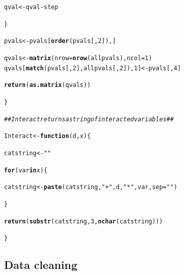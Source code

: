 \documentclass[11pt, a4paper]{article}\usepackage[]{graphicx}\usepackage[]{color}
\makeatletter
\newcommand{\hlnum}[1]{\textcolor[rgb]{0.686,0.059,0.569}{#1}}%
\newcommand{\hlstr}[1]{\textcolor[rgb]{0.192,0.494,0.8}{#1}}%
\newcommand{\hlcom}[1]{\textcolor[rgb]{0.678,0.584,0.686}{\textit{#1}}}%
\newcommand{\hlopt}[1]{\textcolor[rgb]{0,0,0}{#1}}%
\newcommand{\hlstd}[1]{\textcolor[rgb]{0.345,0.345,0.345}{#1}}%
\newcommand{\hlkwa}[1]{\textcolor[rgb]{0.161,0.373,0.58}{\textbf{#1}}}%
\newcommand{\hlkwb}[1]{\textcolor[rgb]{0.69,0.353,0.396}{#1}}%
\newcommand{\hlkwc}[1]{\textcolor[rgb]{0.333,0.667,0.333}{#1}}%
\newcommand{\hlkwd}[1]{\textcolor[rgb]{0.737,0.353,0.396}{\textbf{#1}}}%
\newenvironment{kframe}{%
 \def\at@end@of@kframe{}%
 \ifinner\ifhmode%
  \def\at@end@of@kframe{\end{minipage}}%
  \begin{minipage}{\columnwidth}%
 \fi\fi%
 \def\FrameCommand##1{\hskip\@totalleftmargin \hskip-\fboxsep
 \colorbox{shadecolor}{##1}\hskip-\fboxsep
     \hskip-\linewidth \hskip-\@totalleftmargin \hskip\columnwidth}%
 \MakeFramed {\advance\hsize-\width
   \@totalleftmargin\z@ \linewidth\hsize
   \@setminipage}}%
 {\par\unskip\endMakeFramed%
 \at@end@of@kframe}
\newenvironment{knitrout}{}{} %
\makeatother
\begin{document}
\begin{footnotesize}
\begin{knitrout}
\begin{kframe}
\begin{alltt}
            \hlstd{qval} \hlkwb{<-} \hlstd{qval} \hlopt{-} \hlstd{step}

        \hlstd{\}}

        \hlstd{pvals} \hlkwb{<-} \hlstd{pvals[}\hlkwd{order}\hlstd{(pvals[,} \hlnum{2}\hlstd{]), ]}

        \hlstd{qvals} \hlkwb{<-} \hlkwd{matrix}\hlstd{(}\hlkwc{nrow} \hlstd{=} \hlkwd{nrow}\hlstd{(allpvals),} \hlkwc{ncol} \hlstd{=} \hlnum{1}\hlstd{)}
        \hlstd{qvals[}\hlkwd{match}\hlstd{(pvals[,} \hlnum{2}\hlstd{], allpvals[,} \hlnum{2}\hlstd{]),} \hlnum{1}\hlstd{]} \hlkwb{<-} \hlstd{pvals[,} \hlnum{4}\hlstd{]}

        \hlkwd{return}\hlstd{(}\hlkwd{as.matrix}\hlstd{(qvals))}

    \hlstd{\}}

    \hlcom{## Interact returns a string of interacted variables ##}

    \hlstd{Interact} \hlkwb{<-} \hlkwa{function}\hlstd{(}\hlkwc{d}\hlstd{,} \hlkwc{x}\hlstd{) \{}

        \hlstd{catstring} \hlkwb{<-} \hlstr{""}

        \hlkwa{for} \hlstd{(var} \hlkwa{in} \hlstd{x) \{}

            \hlstd{catstring} \hlkwb{<-} \hlkwd{paste}\hlstd{(catstring,} \hlstr{" + "}\hlstd{, d,} \hlstr{"*"}\hlstd{, var,} \hlkwc{sep} \hlstd{=} \hlstr{""}\hlstd{)}

        \hlstd{\}}

        \hlkwd{return}\hlstd{(}\hlkwd{substr}\hlstd{(catstring,} \hlnum{3}\hlstd{,} \hlkwd{nchar}\hlstd{(catstring)))}

    \hlstd{\}}
\end{alltt}
\end{kframe}
\end{knitrout}

    \subsection{Data cleaning}


\end{footnotesize}
\end{document}
